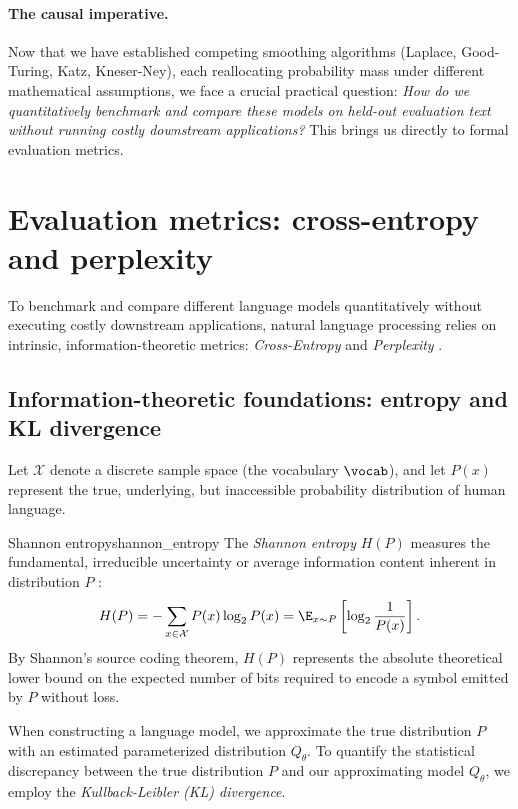 \documentclass[../../main.tex]{subfiles}
\begin{document}
\paragraph{The causal imperative.}
Now that we have established competing smoothing algorithms (Laplace, Good-Turing, Katz, Kneser-Ney), each reallocating probability mass under different mathematical assumptions, we face a crucial practical question: \emph{How do we quantitatively benchmark and compare these models on held-out evaluation text without running costly downstream applications?} This brings us directly to formal evaluation metrics.


\section{Evaluation metrics: cross-entropy and perplexity}
\label{sec:eval_metrics}

To benchmark and compare different language models quantitatively without executing costly downstream applications, natural language processing relies on intrinsic, information-theoretic metrics: \emph{Cross-Entropy} and \emph{Perplexity} \cite{shannon1948,jurafsky2024}.

\subsection{Information-theoretic foundations: entropy and KL divergence}
Let $\mathcal{X}$ denote a discrete sample space (the vocabulary $\vocab$), and let $P(x)$ represent the true, underlying, but inaccessible probability distribution of human language. 

\begin{definition}{Shannon entropy}{shannon_entropy}
The \emph{Shannon entropy} $H(P)$ measures the fundamental, irreducible uncertainty or average information content inherent in distribution $P$ \cite{shannon1948}:
\begin{equation}
\label{eq:shannon_entropy}
H(P) = - \sum_{x \in \mathcal{X}} P(x) \log_2 P(x) = \E_{x \sim P}\left[ \log_2 \frac{1}{P(x)} \right].
\end{equation}
By Shannon's source coding theorem, $H(P)$ represents the absolute theoretical lower bound on the expected number of bits required to encode a symbol emitted by $P$ without loss.
\end{definition}

When constructing a language model, we approximate the true distribution $P$ with an estimated parameterized distribution $Q_\theta$. To quantify the statistical discrepancy between the true distribution $P$ and our approximating model $Q_\theta$, we employ the \emph{Kullback-Leibler (KL) divergence}.
\end{document}
